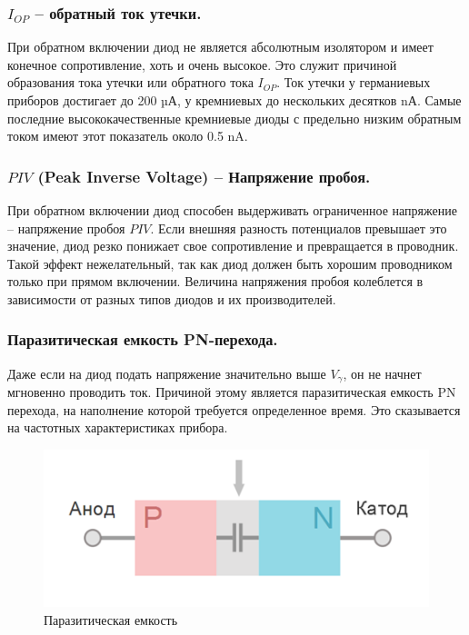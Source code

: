 \documentclass[a4paper,14pt]{article}
\begin{document}
\subsubsection{$I_{OP}$ -- обратный ток утечки.}

При обратном включении диод не является абсолютным изолятором и имеет конечное сопротивление, хоть и очень высокое. 
Это служит причиной образования тока утечки или обратного тока $I_{OP}$. 
Ток утечки у германиевых приборов достигает до 200 µА, у кремниевых до нескольких десятков nА. 
Самые последние высококачественные кремниевые диоды с предельно низким обратным током имеют этот показатель около 0.5 nA.

\subsubsection{$PIV$ (Peak Inverse Voltage) -- Напряжение пробоя.}

При обратном включении диод способен выдерживать ограниченное напряжение – напряжение пробоя $PIV$.
Если внешняя разность потенциалов превышает это значение, диод резко понижает свое сопротивление и превращается в проводник. 
Такой эффект нежелательный, так как диод должен быть хорошим проводником только при прямом включении. 
Величина напряжения пробоя колеблется в зависимости от разных типов диодов и их производителей.

\subsubsection{Паразитическая емкость PN-перехода.}

Даже если на диод подать напряжение значительно выше $V_{\gamma}$, он не начнет мгновенно проводить ток.
Причиной этому является паразитическая емкость PN перехода, на наполнение которой требуется определенное время. 
Это сказывается на частотных характеристиках прибора.

\begin{figure}[H]
	\centering
	\includegraphics[width=0.7\linewidth]{image/intro_003}
	\caption{Паразитическая емкость}
	\label{fig:intro003}
\end{figure}
\end{document}
